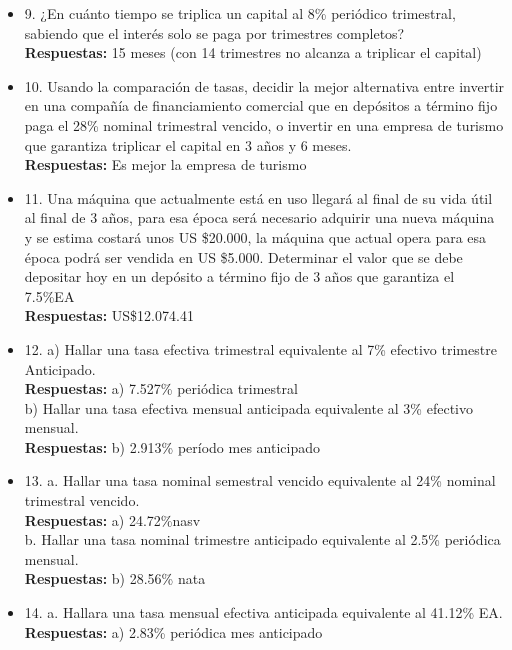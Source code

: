 \begin{itemize}
	\item 9. ¿En cuánto tiempo se triplica un capital al 8\% periódico trimestral, sabiendo que el interés solo se paga por trimestres completos?\\
	\textbf{Respuestas:} 15 meses (con 14 trimestres no alcanza a triplicar el capital)
	\medskip
	
	\item 10. Usando la comparación de tasas, decidir la mejor alternativa entre invertir en una compañía de financiamiento comercial que en depósitos a término fijo paga el 28\% nominal trimestral vencido, o invertir en una empresa de turismo que garantiza triplicar el capital en 3 años y 6 meses.\\
	\textbf{Respuestas:} Es mejor la empresa de turismo
	\medskip
	
	\item 11. Una máquina que actualmente está en uso llegará al final de su vida útil  al final de 3 años, para esa época será necesario adquirir una nueva máquina y se estima costará unos US \$20.000, la máquina que actual opera para esa época podrá ser vendida en US \$5.000. Determinar el  valor que se debe depositar hoy en un depósito a término fijo de 3 años  que garantiza el 7.5\%EA  \\
	\textbf{Respuestas:} US\$12.074.41
	\medskip
	
	\item 12. a) Hallar una tasa efectiva trimestral equivalente al 7\% efectivo trimestre  Anticipado.\\
	\textbf{Respuestas:} a) 7.527\% periódica trimestral\\
	
	b) Hallar una tasa efectiva mensual anticipada equivalente al 3\% efectivo mensual. \\
	\textbf{Respuestas:} b) 2.913\% período mes anticipado
	\medskip
	
	\item 13. a. Hallar una tasa nominal semestral vencido equivalente al 24\% nominal  trimestral vencido.\\
	\textbf{Respuestas:} a) 24.72\%nasv\\
	
	b. Hallar una tasa nominal trimestre anticipado equivalente al 2.5\% periódica mensual.\\
	\textbf{Respuestas:} b) 28.56\% nata
	\medskip
	
	\item 14.  a. Hallara una tasa mensual efectiva anticipada equivalente al 41.12\% EA.\\
	\textbf{Respuestas:} a) 2.83\% periódica mes anticipado \\
	

\end{itemize}

